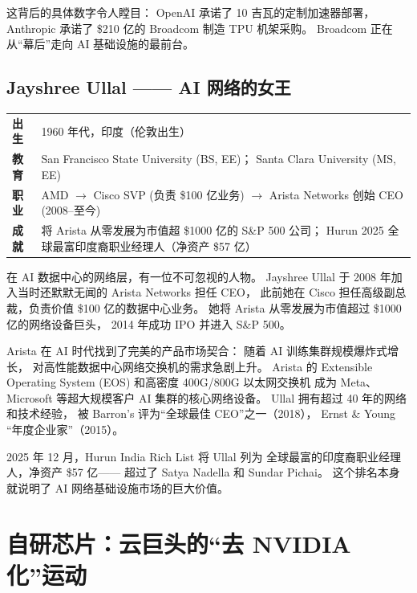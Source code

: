 这背后的具体数字令人瞠目：
OpenAI 承诺了 10 吉瓦的定制加速器部署，
Anthropic 承诺了 \$210 亿的 Broadcom 制造 TPU 机架采购。
Broadcom 正在从``幕后''走向 AI 基础设施的最前台。

\subsection{Jayshree Ullal —— AI 网络的女王}
\label{subsec:ullal}

\begin{keybox}
\small
\begin{tabularx}{\textwidth}{lX}
\toprule
\textbf{出生} & 1960 年代，印度（伦敦出生） \\
\textbf{教育} & San Francisco State University (BS, EE)；
                Santa Clara University (MS, EE) \\
\textbf{职业} & AMD $\to$ Cisco SVP (负责 \$100 亿业务) $\to$
                Arista Networks 创始 CEO (2008--至今) \\
\textbf{成就} & 将 Arista 从零发展为市值超 \$1000 亿的 S\&P 500 公司；
                Hurun 2025 全球最富印度裔职业经理人（净资产 \$57 亿） \\
\bottomrule
\end{tabularx}
\end{keybox}

在 AI 数据中心的网络层，有一位不可忽视的人物。
Jayshree Ullal 于 2008 年加入当时还默默无闻的 Arista Networks 担任 CEO，
此前她在 Cisco 担任高级副总裁，负责价值 \$100 亿的数据中心业务。
她将 Arista 从零发展为市值超过 \$1000 亿的网络设备巨头，
2014 年成功 IPO 并进入 S\&P 500。

Arista 在 AI 时代找到了完美的产品市场契合：
随着 AI 训练集群规模爆炸式增长，
对高性能数据中心网络交换机的需求急剧上升。
Arista 的 Extensible Operating System (EOS)
和高密度 400G/800G 以太网交换机
成为 Meta、Microsoft 等超大规模客户 AI 集群的核心网络设备。
Ullal 拥有超过 40 年的网络和技术经验，
被 Barron's 评为``全球最佳 CEO''之一（2018），
Ernst \& Young ``年度企业家''（2015）。

2025 年 12 月，Hurun India Rich List 将 Ullal 列为
全球最富的印度裔职业经理人，净资产 \$57 亿——
超过了 Satya Nadella 和 Sundar Pichai。
这个排名本身就说明了 AI 网络基础设施市场的巨大价值。

\section{自研芯片：云巨头的``去 NVIDIA 化''运动}
\label{sec:custom-silicon}

